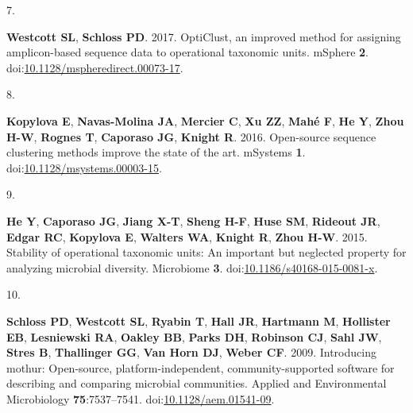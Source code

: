 \documentclass[
  11pt,
]{article}
\newlength{\cslhangindent}
\newlength{\csllabelwidth}
\newenvironment{CSLReferences}[2] %
 {\begin{list}{}{%
  \setlength{\itemindent}{0pt}
  \setlength{\leftmargin}{0pt}
  \setlength{\parsep}{0pt}
  \ifodd #1
   \setlength{\leftmargin}{\cslhangindent}
   \setlength{\itemindent}{-1\cslhangindent}
  \fi
  \setlength{\itemsep}{#2\baselineskip}}}
 {\end{list}}
\newcommand{\CSLLeftMargin}[1]{\parbox[t]{\csllabelwidth}{\strut#1\strut}}
\newcommand{\CSLRightInline}[1]{\parbox[t]{\linewidth - \csllabelwidth}{\strut#1\strut}}
\begin{document}
\begin{CSLReferences}{0}{1}
\CSLLeftMargin{7. }%
\CSLRightInline{\textbf{Westcott SL}, \textbf{Schloss PD}. 2017.
OptiClust, an improved method for assigning amplicon-based sequence data
to operational taxonomic units. mSphere \textbf{2}.
doi:\href{https://doi.org/10.1128/mspheredirect.00073-17}{10.1128/mspheredirect.00073-17}.}

\CSLLeftMargin{8. }%
\CSLRightInline{\textbf{Kopylova E}, \textbf{Navas-Molina JA},
\textbf{Mercier C}, \textbf{Xu ZZ}, \textbf{Mahé F}, \textbf{He Y},
\textbf{Zhou H-W}, \textbf{Rognes T}, \textbf{Caporaso JG},
\textbf{Knight R}. 2016. Open-source sequence clustering methods improve
the state of the art. mSystems \textbf{1}.
doi:\href{https://doi.org/10.1128/msystems.00003-15}{10.1128/msystems.00003-15}.}

\CSLLeftMargin{9. }%
\CSLRightInline{\textbf{He Y}, \textbf{Caporaso JG}, \textbf{Jiang X-T},
\textbf{Sheng H-F}, \textbf{Huse SM}, \textbf{Rideout JR}, \textbf{Edgar
RC}, \textbf{Kopylova E}, \textbf{Walters WA}, \textbf{Knight R},
\textbf{Zhou H-W}. 2015. Stability of operational taxonomic units: An
important but neglected property for analyzing microbial diversity.
Microbiome \textbf{3}.
doi:\href{https://doi.org/10.1186/s40168-015-0081-x}{10.1186/s40168-015-0081-x}.}

\CSLLeftMargin{10. }%
\CSLRightInline{\textbf{Schloss PD}, \textbf{Westcott SL},
\textbf{Ryabin T}, \textbf{Hall JR}, \textbf{Hartmann M},
\textbf{Hollister EB}, \textbf{Lesniewski RA}, \textbf{Oakley BB},
\textbf{Parks DH}, \textbf{Robinson CJ}, \textbf{Sahl JW}, \textbf{Stres
B}, \textbf{Thallinger GG}, \textbf{Van Horn DJ}, \textbf{Weber CF}.
2009. Introducing mothur: Open-source, platform-independent,
community-supported software for describing and comparing microbial
communities. Applied and Environmental Microbiology
\textbf{75}:7537--7541.
doi:\href{https://doi.org/10.1128/aem.01541-09}{10.1128/aem.01541-09}.}


\end{CSLReferences}
\end{document}
